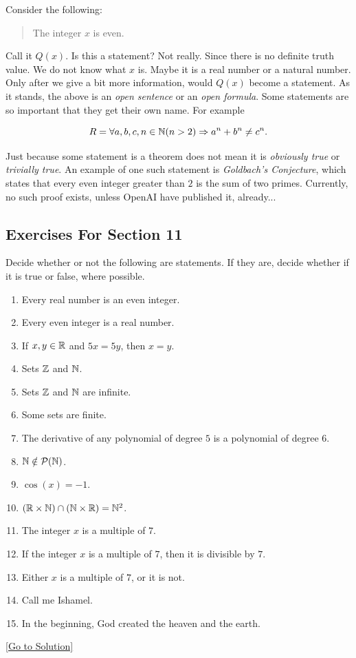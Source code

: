 Consider the following: 
\begin{quote}
    The integer $x$ is even.
\end{quote}
Call it $Q(x)$. Is this a statement? Not really. Since there is no definite truth value. We do not know what $x$ is. Maybe it is a real number or a natural number. Only after we give a bit more information, would $Q(x)$ become a statement. As it stands, the above is an \emph{open sentence} or an \emph{open formula}. \newline
Some statements are so important that they get their own name. For example
\begin{theorem}
    $$
    R=\forall a,b,c,n\in\mathbb{N}(n>2)\Rightarrow a^{n}+b^{n}\ne c^{n}.
    $$
\end{theorem}
Just because some statement is a theorem does not mean it is \emph{obviously true} or \emph{trivially true}. An example of one such statement is \emph{Goldbach's Conjecture}, which states that every even integer greater than $2$ is the sum of two primes. Currently, no such proof exists, unless OpenAI have published it, already... 

\subsection{Exercises For Section 11}
\begin{exercise}\label{ex:2.11}
    Decide whether or not the following are statements. If they are, decide whether if it is true or false, where possible. 
    \begin{enumerate}
        \item Every real number is an even integer. 
        \item Every even integer is a real number. 
        \item If $x,y\in\mathbb{R}$ and $5x=5y$, then $x=y$. 
        \item Sets $\mathbb{Z}$ and $\mathbb{N}$. 
        \item Sets $\mathbb{Z}$ and $\mathbb{N}$ are infinite.
        \item Some sets are finite. 
        \item The derivative of any polynomial of degree $5$ is a polynomial of degree $6$. 
        \item $\mathbb{N}\notin\mathcal{P}(\mathbb{N})$.
        \item $\cos(x)=-1$.
        \item $(\mathbb{R}\times\mathbb{N})\cap(\mathbb{N}\times\mathbb{R})=\mathbb{N}^{2}$.
        \item The integer $x$ is a multiple of $7$. 
        \item If the integer $x$ is a multiple of $7$, then it is divisible by $7$. 
        \item Either $x$ is a multiple of $7$, or it is not. 
        \item Call me Ishamel. 
        \item In the beginning, God created the heaven and the earth. 
    \end{enumerate}
\end{exercise}\hyperref[sol:2.11]{[Go to Solution]}